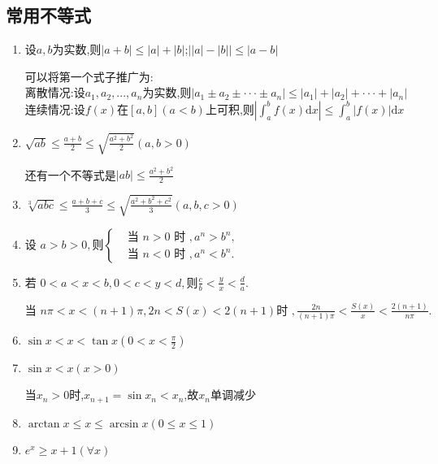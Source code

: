 \documentclass[12pt, a4paper, oneside, UTF8]{ctexbook}  %
\begin{document}
\subsection{常用不等式}
\begin{enumerate}
    \item 设$a,b$为实数,则$|a+b|\leq |a|+|b|$;$\mid|a|-|b|\mid\leqslant|a-b|$
          \begin{criterion}{}{}
              可以将第一个式子推广为:\\
              离散情况:设$a_1,a_2,...,a_n$为实数,则$|a_1\pm a_2\pm\cdotp\cdotp\cdotp \pm a_n|\leqslant|a_1|+|a_2|+\cdotp\cdotp\cdotp+|a_n|$\\
              连续情况:设$f(x)$在$[a,b](a<b)$上可积,则$\left|\int_a^bf\left(x\right)\mathrm{d}x\right|\leqslant\int_a^b\big|f(x)\big|\mathrm{d}x$
          \end{criterion}
    \item $\sqrt{ab}{\leqslant}\frac{a+b}{2}{\leqslant}\sqrt{\frac{a^{2}+b^{2}}{2}}(a,b{>}0)$
          \begin{criterion}{}{}
              还有一个不等式是$|ab|\leqslant \frac{a^2+b^2}{2}$
          \end{criterion}
    \item $\sqrt[3]{abc}\leqslant\frac{a+b+c}3\leqslant\sqrt{\frac{a^2+b^2+c^2}3}(a,b,c>0)$
    \item $\text{设 }a>b>0,\text{则}\left\{\begin{aligned}&\text{当 }n>0\text{ 时 },a^n>b^n,\\&\text{当 }n<0\text{ 时 },a^n<b^n.\end{aligned}\right.$
    \item $\text{若 }0<a<x<b,0<c<y<d,\text{则}\frac{c}{b}<\frac{y}{x}<\frac{d}{a}.$
          \begin{criterion}{}{}
              $\text{当 }n\pi<x<(n+1)\pi,2n<S(x)<2(n+1)\text{时 },\frac{2n}{(n+1)\pi}<\frac{S(x)}{x}<\frac{2(n+1)}{n\pi}.$
          \end{criterion}
    \item $\sin x<x<\tan x\left(0<x<\frac{\pi}{2}\right)$
    \item $\sin x < x(x>0)$
          \begin{criterion}{}{}
              当$x_n>0$时,$x_{n+1}=\sin x_n <x_n$,故${x_n}$单调减少
          \end{criterion}
    \item $\arctan x{\leqslant}x{\leqslant}\arcsin x(0{\leqslant}x{\leqslant}1)$
    \item $e^x \geqslant  x+1 (\forall x)$

\end{enumerate}
\end{document}
